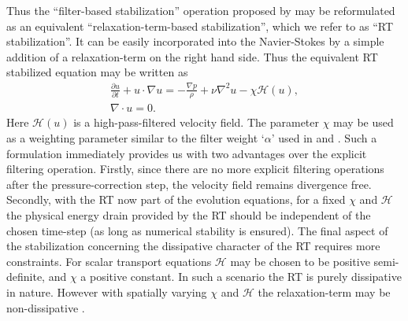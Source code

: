 Thus the ``filter-based stabilization'' operation proposed by \cite{fischer01} may be reformulated as an equivalent ``relaxation-term-based stabilization'', which we refer to as ``RT stabilization''. It can be easily incorporated into the Navier-Stokes by a simple addition of a relaxation-term on the right hand side. Thus the equivalent RT stabilized equation may be written as \citep{schlatter04}
\begin{align}
	\frac{\partial u}{\partial t} + u\cdot\nabla u = -\frac{\nabla p}{\rho} + \nu\nabla^{2}u -\chi\mathcal{H}(u), \\
	\nabla\cdot u = 0.
	\label{eqn:rt_NS}
\end{align}
Here $\mathcal{H}(u)$ is a high-pass-filtered velocity field. The parameter $\chi$ may be used as a weighting parameter similar to the filter weight `$\alpha$' used in \cite{fischer01} and \cite{malm13}. Such a formulation immediately provides us with two advantages over the explicit filtering operation. Firstly, since there are no more explicit filtering operations after the pressure-correction step, the velocity field remains divergence free. Secondly, with the RT now part of the evolution equations, for a fixed $\chi$ and $\mathcal{H}$ the physical energy drain provided by the RT should be independent of the chosen time-step (as long as numerical stability is ensured). The final aspect of the stabilization concerning the dissipative character of the RT requires more constraints. For scalar transport equations $\mathcal{H}$ may be chosen to be positive semi-definite, and $\chi$ a positive constant. In such a scenario the RT is purely dissipative in nature. However with spatially varying $\chi$ and $\mathcal{H}$ the relaxation-term may be non-dissipative \citep{stolz03}.
